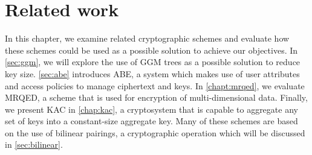 \documentclass[hyp,a4paper,12pt,openbib]{socreport}
\begin{document}






\chapter{Related work}

In this chapter, we examine related cryptographic schemes and evaluate how these schemes could be used as a possible solution to achieve our objectives. In \cref{sec:ggm}, we will explore the use of GGM trees as a possible solution to reduce key size. \cref{sec:abe} introduces ABE, a system which makes use of user attributes and access policies to manage ciphertext and keys. In \cref{chapt:mrqed}, we evaluate MRQED, a scheme that is used for encryption of multi-dimensional data. Finally, we present KAC in \cref{chap:kac}, a cryptosystem that is capable to aggregate any set of keys into a constant-size aggregate key. Many of these schemes are based on the use of bilinear pairings, a cryptographic operation which will be discussed in \cref{sec:bilinear}. 
\end{document}
